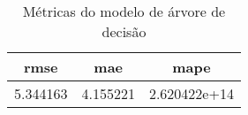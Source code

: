 \begin{table}
\centering
\caption{Métricas do modelo de árvore de decisão}
\label{tab:tree_metrics}
\begin{tabular}{ccc}
\toprule
    rmse &      mae &         mape \\
\midrule
5.344163 & 4.155221 & 2.620422e+14 \\
\bottomrule
\end{tabular}
\end{table}

